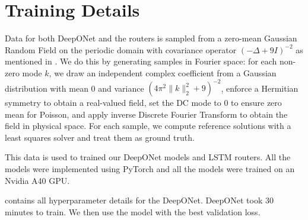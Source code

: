 \documentclass{article} %
\begin{document}
\section{Training Details} \label{sec:training details}

Data for both DeepONet and the routers is sampled from a zero-mean Gaussian Random Field on the periodic domain with covariance operator $(- \Delta + 9I)^{-2}$ as mentioned in . We do this by generating samples in Fourier space: for each non-zero mode $k$, we draw an independent complex coefficient from a Gaussian distribution with mean 0 and variance $(4\pi^2 \|k\|^2_2 + 9)^{-2}$, enforce a Hermitian symmetry to obtain a real-valued field, set the DC mode to $0$ to ensure zero mean for Poisson, and apply inverse Discrete Fourier Transform to obtain the field in physical space. For each sample, we compute reference solutions with a least squares solver and treat them as ground truth. 

This data is used to trained our DeepONet models and LSTM routers. All the models were implemented using PyTorch and all the models were trained on an Nvidia A40 GPU.

 contains all hyperparameter details for the DeepONet. DeepONet took 30 minutes to train. We then use the model with the best validation loss. 
\end{document}
